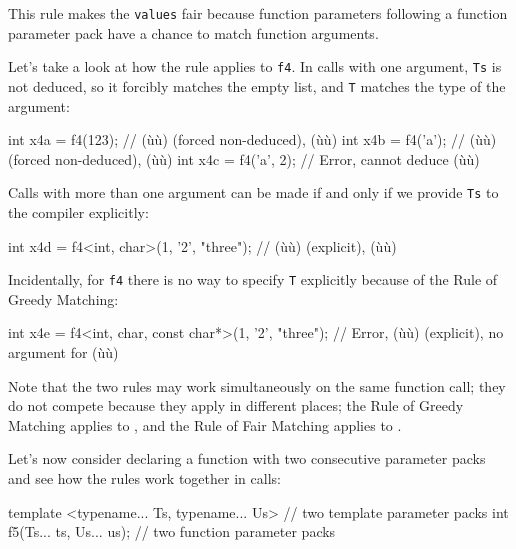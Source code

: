This rule makes the  \lstinline!values!
fair because function parameters following a function parameter pack
have a chance to match function arguments.

Let's take a look at how the rule applies to \lstinline!f4!. In calls with
one argument, \lstinline!Ts! is not deduced, so it forcibly matches the
empty list, and \lstinline!T! matches the type of the argument:

\begin{emcppslisting}[emcppsbatch=e20]
int x4a = f4(123);     // (ù{}ù) (forced non-deduced), (ù{}ù)
int x4b = f4('a');     // (ù{}ù) (forced non-deduced), (ù{}ù)
int x4c = f4('a', 2);  // Error, cannot deduce (ù{}ù)
\end{emcppslisting}
    

\noindent Calls with more than one argument can be made if and only if we provide
\lstinline!Ts! to the compiler explicitly:

\begin{emcppslisting}[emcppsbatch=e20]
int x4d = f4<int, char>(1, '2', "three");
    // (ù{}ù) (explicit), (ù{}ù)
\end{emcppslisting}
    

\noindent Incidentally, for \lstinline!f4! there is no way to specify \lstinline!T!
explicitly because of the Rule of Greedy Matching:

\begin{emcppslisting}[emcppsbatch=e20]
int x4e = f4<int, char, const char*>(1, '2', "three");
    // Error, (ù{}ù) (explicit), no argument for (ù{}ù)
\end{emcppslisting}
    

\noindent Note that the two rules may work simultaneously on the same function
call; they do not compete because they apply in different places; the
Rule of Greedy Matching applies to ,
and the Rule of Fair Matching applies to .

Let's now consider declaring a function with two consecutive parameter
packs and see how the rules work together in calls:

\begin{emcppslisting}[emcppsbatch=e21]
template <typename... Ts, typename... Us>  // two template parameter packs
int f5(Ts... ts, Us... us);                // two function parameter packs
\end{emcppslisting}
    

